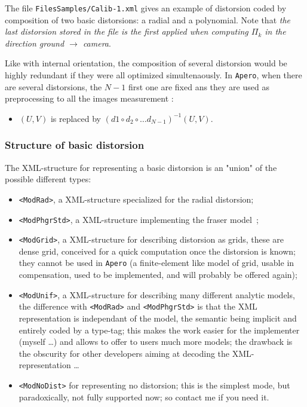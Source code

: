 The file {\tt FilesSamples/Calib-1.xml} gives an example of distorsion coded
by composition of two basic distorsions: a radial  and a polynomial. Note that
\emph{the last distorsion stored in the file is the first applied when computing
$\Pi_k$ in the direction ground $\rightarrow$  camera}.

Like with internal orientation, the composition of several distorsion
would be   highly redundant if they were all optimized simultenaously.
In {\tt Apero}, when there are several distorsions, the $N-1$ first one are
fixed ans they are used as preprocessing to all the images measurement :

\begin{itemize}
       \item $(U,V)$ is replaced by $(d1 \circ d_2 \circ \dots d_{N-1}) ^{-1}(U,V)$.
\end{itemize}


\subsubsection{Structure of basic distorsion}

The XML-structure for representing a basic distorsion is an "union" of the possible
different types:

\begin{itemize}
   \item {\tt <ModRad>}, a XML-structure specialized for the radial distorsion;

   \item {\tt <ModPhgrStd>}, a XML-structure implementing the fraser model~\cite{Fraser};

   \item {\tt <ModGrid>}, a XML-structure for describing distorsion as grids, these are dense
         grid, conceived for a quick computation once the distorsion is known; they cannot
         be used in {\tt Apero} (a finite-element like model of grid, usable in compensation,
         used  to be implemented, and will probably be offered again);

   \item {\tt <ModUnif>}, a XML-structure for describing many different analytic models, the
         difference with {\tt <ModRad>} and {\tt <ModPhgrStd>} is that the XML representation
         is independant of the model, the semantic being implicit and entirely coded by a type-tag;
         this makes the work easier for the implementer (myself \dots) and allows to offer to users
         much more models; the drawback is the obscurity for other developers aiming at decoding
         the XML-representation \dots

   \item {\tt <ModNoDist>} for representing no distorsion; this is the simplest mode, but paradoxically,
         not fully supported now; so contact me if you need it.
\end{itemize}

